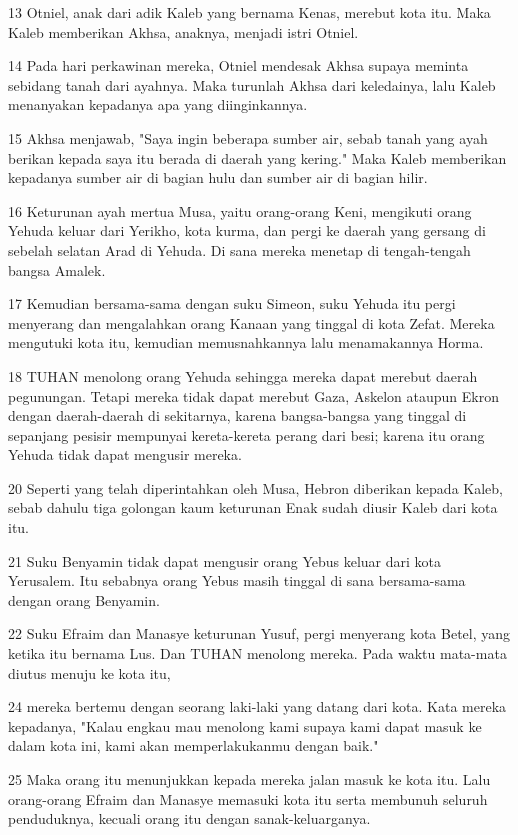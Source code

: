 \par 13 Otniel, anak dari adik Kaleb yang bernama Kenas, merebut kota itu. Maka Kaleb memberikan Akhsa, anaknya, menjadi istri Otniel.
\par 14 Pada hari perkawinan mereka, Otniel mendesak Akhsa supaya meminta sebidang tanah dari ayahnya. Maka turunlah Akhsa dari keledainya, lalu Kaleb menanyakan kepadanya apa yang diinginkannya.
\par 15 Akhsa menjawab, "Saya ingin beberapa sumber air, sebab tanah yang ayah berikan kepada saya itu berada di daerah yang kering." Maka Kaleb memberikan kepadanya sumber air di bagian hulu dan sumber air di bagian hilir.
\par 16 Keturunan ayah mertua Musa, yaitu orang-orang Keni, mengikuti orang Yehuda keluar dari Yerikho, kota kurma, dan pergi ke daerah yang gersang di sebelah selatan Arad di Yehuda. Di sana mereka menetap di tengah-tengah bangsa Amalek.
\par 17 Kemudian bersama-sama dengan suku Simeon, suku Yehuda itu pergi menyerang dan mengalahkan orang Kanaan yang tinggal di kota Zefat. Mereka mengutuki kota itu, kemudian memusnahkannya lalu menamakannya Horma.
\par 18 TUHAN menolong orang Yehuda sehingga mereka dapat merebut daerah pegunungan. Tetapi mereka tidak dapat merebut Gaza, Askelon ataupun Ekron dengan daerah-daerah di sekitarnya, karena bangsa-bangsa yang tinggal di sepanjang pesisir mempunyai kereta-kereta perang dari besi; karena itu orang Yehuda tidak dapat mengusir mereka.
\par 20 Seperti yang telah diperintahkan oleh Musa, Hebron diberikan kepada Kaleb, sebab dahulu tiga golongan kaum keturunan Enak sudah diusir Kaleb dari kota itu.
\par 21 Suku Benyamin tidak dapat mengusir orang Yebus keluar dari kota Yerusalem. Itu sebabnya orang Yebus masih tinggal di sana bersama-sama dengan orang Benyamin.
\par 22 Suku Efraim dan Manasye keturunan Yusuf, pergi menyerang kota Betel, yang ketika itu bernama Lus. Dan TUHAN menolong mereka. Pada waktu mata-mata diutus menuju ke kota itu,
\par 24 mereka bertemu dengan seorang laki-laki yang datang dari kota. Kata mereka kepadanya, "Kalau engkau mau menolong kami supaya kami dapat masuk ke dalam kota ini, kami akan memperlakukanmu dengan baik."
\par 25 Maka orang itu menunjukkan kepada mereka jalan masuk ke kota itu. Lalu orang-orang Efraim dan Manasye memasuki kota itu serta membunuh seluruh penduduknya, kecuali orang itu dengan sanak-keluarganya.
